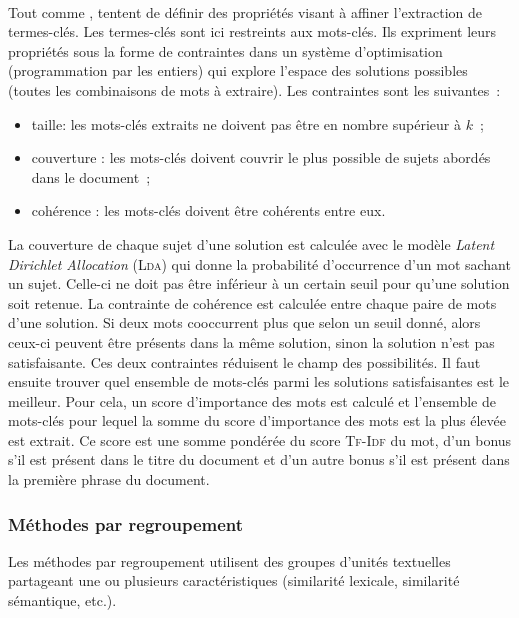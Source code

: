         \label{subsubsec:main-state_of_the_art-automatic_keyphrase_extraction-unsupervised_keyphrase_extraction-statistical_approaches:ilp}
        ~\\Tout comme ,
         tentent de définir des
        propriétés visant à affiner l'extraction de termes-clés. Les termes-clés
        sont ici restreints aux mots-clés. Ils expriment leurs propriétés sous
        la forme de contraintes dans un système d'optimisation (programmation
        par les entiers) qui explore l'espace des solutions possibles (toutes
        les combinaisons de mots à extraire). Les contraintes sont les
        suivantes~:
        \begin{itemize}
          \item{taille: les mots-clés extraits ne doivent pas être en nombre
                supérieur à $k$~;}
          \item{couverture : les mots-clés doivent couvrir le plus possible de
                sujets abordés dans le document~;}
          \item{cohérence : les mots-clés doivent être cohérents entre eux.}
        \end{itemize}
        La couverture de chaque sujet d'une solution est calculée avec le modèle
        \textit{Latent Dirichlet Allocation} (\textsc{Lda}) \cite{blei2003lda}
        qui donne la probabilité d'occurrence d'un mot sachant un sujet.
        Celle-ci ne doit pas être inférieur à un certain seuil pour qu'une
        solution soit retenue. La contrainte de cohérence est calculée entre
        chaque paire de mots d'une solution. Si deux mots cooccurrent plus que
        selon un seuil donné, alors ceux-ci peuvent être présents dans la même
        solution, sinon la solution n'est pas satisfaisante. Ces deux
        contraintes réduisent le champ des possibilités. Il faut ensuite
        trouver quel ensemble de mots-clés parmi les solutions satisfaisantes
        est le meilleur. Pour cela, un score d'importance des mots est calculé
        et l'ensemble de mots-clés pour lequel la somme du score d'importance
        des mots est la plus élevée est extrait. Ce score est une somme pondérée
        du score \textsc{Tf-Idf} du mot, d'un bonus s'il est présent dans le
        titre du document et d'un autre bonus s'il est présent dans la première
        phrase du document.

      \subsubsection{Méthodes par regroupement}
      \label{subsubsec:main-state_of_the_art-automatic_keyphrase_extraction-unsupervised_keyphrase_extraction-clustering_approaches}
        Les méthodes par regroupement utilisent des groupes d'unités textuelles
        partageant une ou plusieurs caractéristiques (similarité lexicale,
        similarité sémantique, etc.).

